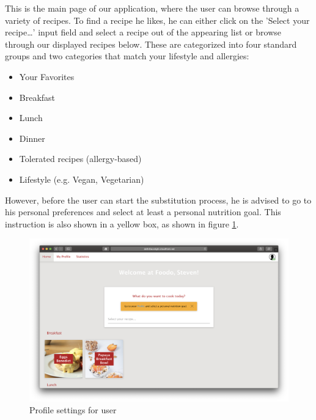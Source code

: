 This is the main page of our application, where the user can browse through a variety of recipes. To find a recipe he likes, he can either click on the 'Select your recipe…' input field and select a recipe out of the appearing list or browse through our displayed recipes below. These are categorized into four standard groups and two categories that match your lifestyle and allergies:
\clearpage
\begin{itemize}
\item Your Favorites
\item Breakfast
\item Lunch
\item Dinner
\item Tolerated recipes (allergy-based)
\item Lifestyle (e.g. Vegan, Vegetarian)
\end{itemize}	
However, before the user can start the substitution process, he is advised to go to his personal preferences and select at least a personal nutrition goal. This instruction is also shown in a yellow box, as shown in figure \ref{fig:profilesetting}.

\vspace{-1em}
\begin{figure}[H]
	\captionsetup{justification=centering}
	\centering
	\includegraphics[scale=0.30]{Ressourcen/img/screenshots/screenshot41.png}
	\vspace{-3em}
	\caption{Profile settings for user}
	\label{fig:profilesetting}
\end{figure}

